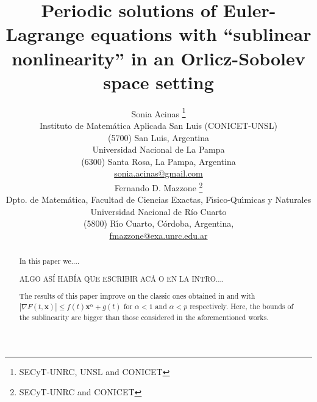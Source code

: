 \documentclass[twoside]{article}
\title{Periodic solutions of 
Euler-Lagrange equations with ``sublinear nonlinearity'' in an Orlicz-Sobolev space setting}
\author{Sonia Acinas \thanks{SECyT-UNRC, UNSL and CONICET}\\
Instituto de Matem\'atica Aplicada San Luis (CONICET-UNSL)\\
(5700) San Luis, Argentina\\
Universidad Nacional de La Pampa\\
(6300) Santa Rosa, La Pampa, Argentina\\
\url{sonia.acinas@gmail.com}\\[3mm]
Fernando D. Mazzone \thanks{SECyT-UNRC and CONICET}\\
Dpto. de Matem\'atica, Facultad de Ciencias Exactas, F\'{\i}sico-Qu\'{\i}micas y Naturales\\
Universidad Nacional de R\'{i}o Cuarto\\
(5800) R\'{\i}o Cuarto, C\'ordoba, Argentina,\\
\url{fmazzone@exa.unrc.edu.ar}
}
\date{}
\theoremstyle{remark}
\renewcommand{\b}[1]{\boldsymbol{#1}}
\renewcommand{\leq}{\leqslant}
\begin{document}
\maketitle
%
\begingroup%
    \renewcommand{\thefootnote}{}%
    \endgroup
%
%
%
%

\begin{abstract}
In this paper we....

ALGO AS\'I HAB\'IA QUE ESCRIBIR AC\'A O EN LA INTRO....

The results of this paper improve on the classic ones obtained in \cite{tang1998periodic} and \cite{tang2010periodic} with $|\nabla F(t,\b{x})|\leq f(t) \b{x}^{\alpha}+g(t)$
for $\alpha<1$ and $\alpha<p$ respectively. Here, the bounds of the sublinearity are bigger than those considered in the aforementioned works.
\end{abstract}




\pagestyle{fancy} \headheight 35pt \fancyhead{} \fancyfoot{}

\fancyfoot[C]{\thepage}  \fancyhead[CO]{\nouppercase{\section}}

\fancyhead[CO]{\nouppercase{\leftmark}}


\end{document}
